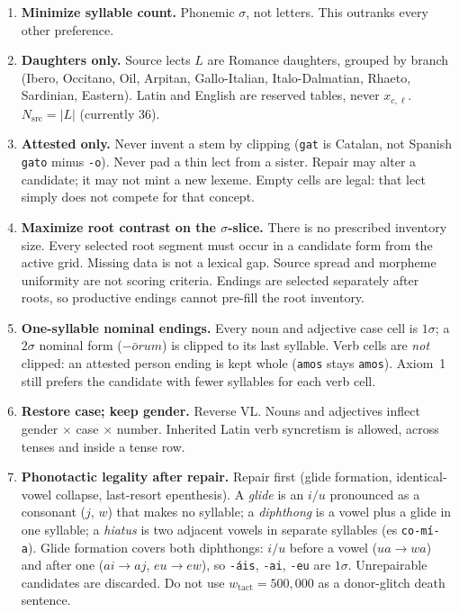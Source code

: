 \documentclass[12pt]{book}
\begin{document}
\begin{enumerate}
  \item \textbf{Minimize syllable count.} Phonemic $\sigma$, not letters.
        This outranks every other preference.
  \item \textbf{Daughters only.} Source lects $L$ are Romance daughters,
        grouped by branch (Ibero, Occitano, Oil, Arpitan, Gallo-Italian,
        Italo-Dalmatian, Rhaeto, Sardinian, Eastern). Latin and English
        are reserved tables, never $x_{c,\ell}$.
        $N_{\mathrm{src}}=|L|$ (currently 36).
  \item \textbf{Attested only.} Never invent a stem by clipping
        (\texttt{gat} is Catalan, not Spanish \texttt{gato} minus
        \texttt{-o}). Never pad a thin lect from a sister.
        Repair may alter a candidate; it may not mint a
        new lexeme. Empty cells are legal: that lect simply does not
        compete for that concept.
  \item \textbf{Maximize root contrast on the $\sigma$-slice.}
        There is no prescribed inventory size. Every selected root segment must
        occur in a candidate form from the active grid. Missing data is not
        a lexical gap. Source spread and morpheme uniformity are not scoring
        criteria. Endings are selected separately after roots, so productive
        endings cannot pre-fill the root inventory.
  \item \textbf{One-syllable nominal endings.} Every noun and adjective
        case cell is $1\sigma$; a $2\sigma$ nominal form
        ($-\bar{o}rum$) is clipped to its last syllable. Verb cells are
        \emph{not} clipped: an attested person ending is kept whole
        (\texttt{amos} stays \texttt{amos}). Axiom~1 still prefers the
        candidate with fewer syllables for each verb cell.
  \item \textbf{Restore case; keep gender.} Reverse VL. Nouns and
        adjectives inflect gender $\times$ case $\times$ number.
        Inherited Latin verb syncretism is allowed, across tenses and
        inside a tense row.
  \item \textbf{Phonotactic legality after repair.} Repair first
        (glide formation, identical-vowel collapse, last-resort
        epenthesis). A \emph{glide} is an $i/u$ pronounced as a
        consonant ($j$, $w$) that makes no syllable; a \emph{diphthong}
        is a vowel plus a glide in one syllable; a \emph{hiatus} is two
        adjacent vowels in separate syllables (es \texttt{co-mí-a}).
        Glide formation covers both diphthongs: $i/u$
        before a vowel ($ua \to wa$) and after one ($ai \to aj$,
        $eu \to ew$), so \texttt{-áis}, \texttt{-ai}, \texttt{-eu}
        are $1\sigma$. Unrepairable candidates are discarded. Do not
        use $w_{\mathrm{tact}}=500{,}000$ as a donor-glitch death
        sentence.
\end{enumerate}
\end{document}
